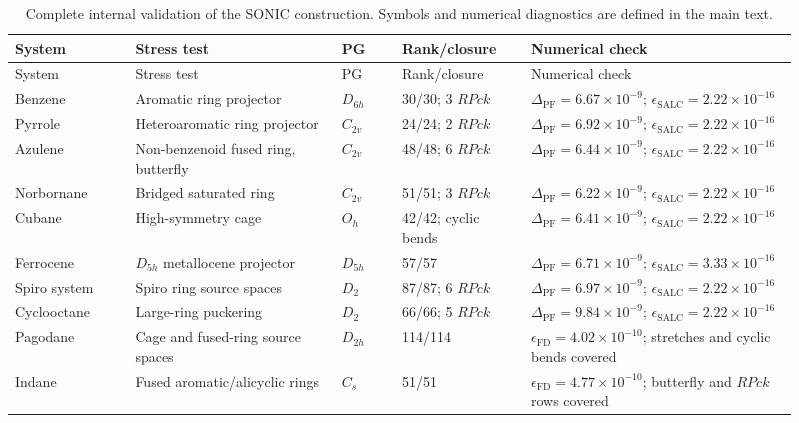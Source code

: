 \documentclass[10pt]{article}
\begin{document}
\scriptsize
\setlength{\tabcolsep}{3pt}
\begin{longtable}{@{}p{0.14\linewidth}p{0.24\linewidth}p{0.07\linewidth}p{0.15\linewidth}p{0.31\linewidth}@{}}
\caption{Complete internal validation of the SONIC construction.  Symbols and
numerical diagnostics are defined in the main text.}\label{tab:si-validation-full}\\
\toprule
System & Stress test & PG & Rank/closure & Numerical check \\
\midrule
\endfirsthead
\toprule
System & Stress test & PG & Rank/closure & Numerical check \\
\midrule
\endhead
Benzene & Aromatic ring projector & \(D_{6h}\) & 30/30; 3 \(RPck\) & \(\Delta_\mathrm{PF}=6.67\times10^{-9}\); \(\epsilon_\mathrm{SALC}=2.22\times10^{-16}\) \\
\midrule
Pyrrole & Heteroaromatic ring projector & \(C_{2v}\) & 24/24; 2 \(RPck\) & \(\Delta_\mathrm{PF}=6.92\times10^{-9}\); \(\epsilon_\mathrm{SALC}=2.22\times10^{-16}\) \\
\midrule
Azulene & Non-benzenoid fused ring, butterfly & \(C_{2v}\) & 48/48; 6 \(RPck\) & \(\Delta_\mathrm{PF}=6.44\times10^{-9}\); \(\epsilon_\mathrm{SALC}=2.22\times10^{-16}\) \\
\midrule
Norbornane & Bridged saturated ring & \(C_{2v}\) & 51/51; 3 \(RPck\) & \(\Delta_\mathrm{PF}=6.22\times10^{-9}\); \(\epsilon_\mathrm{SALC}=2.22\times10^{-16}\) \\
\midrule
Cubane & High-symmetry cage & \(O_h\) & 42/42; cyclic bends & \(\Delta_\mathrm{PF}=6.41\times10^{-9}\); \(\epsilon_\mathrm{SALC}=2.22\times10^{-16}\) \\
\midrule
Ferrocene & \(D_{5h}\) metallocene projector & \(D_{5h}\) & 57/57 & \(\Delta_\mathrm{PF}=6.71\times10^{-9}\); \(\epsilon_\mathrm{SALC}=3.33\times10^{-16}\) \\
\midrule
Spiro system & Spiro ring source spaces & \(D_2\) & 87/87; 6 \(RPck\) & \(\Delta_\mathrm{PF}=6.97\times10^{-9}\); \(\epsilon_\mathrm{SALC}=2.22\times10^{-16}\) \\
\midrule
Cyclooctane & Large-ring puckering & \(D_2\) & 66/66; 5 \(RPck\) & \(\Delta_\mathrm{PF}=9.84\times10^{-9}\); \(\epsilon_\mathrm{SALC}=2.22\times10^{-16}\) \\
\midrule
Pagodane & Cage and fused-ring source spaces & \(D_{2h}\) & 114/114 & \(\epsilon_\mathrm{FD}=4.02\times10^{-10}\); stretches and cyclic bends covered \\
\midrule
Indane & Fused aromatic/alicyclic rings & \(C_s\) & 51/51 & \(\epsilon_\mathrm{FD}=4.77\times10^{-10}\); butterfly and \(RPck\) rows covered \\

\end{longtable}
\end{document}
